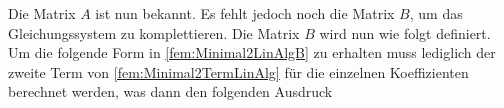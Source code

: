 Die Matrix $A$ ist nun bekannt.
Es fehlt jedoch noch die Matrix $B$, um das Gleichungssystem zu komplettieren.
Die Matrix $B$ wird nun wie folgt definiert.
Um die folgende Form in \eqref{fem:Minimal2LinAlgB} zu erhalten muss lediglich der zweite Term von \eqref{fem:Minimal2TermLinAlg} für die einzelnen Koeffizienten berechnet werden, was dann den folgenden Ausdruck

